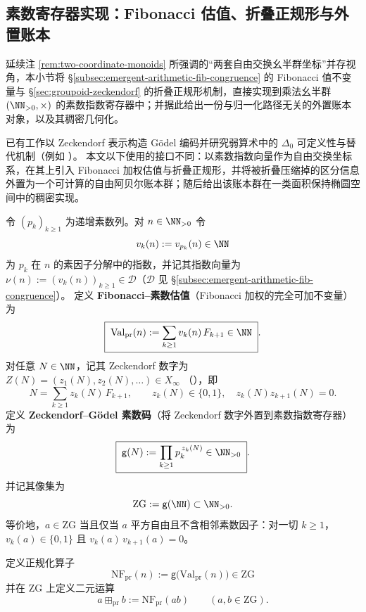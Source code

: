\subsection{素数寄存器实现：Fibonacci 估值、折叠正规形与外置账本}\label{subsec:emergent-arithmetic-prime-register-fib-valuation}

延续注 \ref{rem:two-coordinate-monoids} 所强调的“两套自由交换幺半群坐标”并存视角，本小节将 \S\ref{subsec:emergent-arithmetic-fib-congruence} 的 Fibonacci 值不变量与 \S\ref{sec:groupoid-zeckendorf} 的折叠正规形机制，直接实现到乘法幺半群 \((\NN_{>0},\times)\) 的素数指数寄存器中；并据此给出一份与归一化路径无关的外置账本对象，以及其稠密几何化。

\begin{remark}\label{rem:zeckendorf-godel-disambiguation}
已有工作以 Zeckendorf 表示构造 Gödel 编码并研究弱算术中的 \(\Delta_0\) 可定义性与替代机制（例如 \cite{Rosko2025FibonacciBasedGodelNumbering}）。
本文以下使用的接口不同：以素数指数向量作为自由交换坐标系，在其上引入 Fibonacci 加权估值与折叠正规形，并将被折叠压缩掉的区分信息外置为一个可计算的自由阿贝尔账本群；随后给出该账本群在一类面积保持椭圆空间中的稠密实现。
\end{remark}

\begin{definition}\label{def:prime-register-fib-valuation-zg-code}
令 \((p_k)_{k\ge 1}\) 为递增素数列。对 \(n\in\NN_{>0}\) 令
\[
v_k(n):=v_{p_k}(n)\in\NN
\]
为 \(p_k\) 在 \(n\) 的素因子分解中的指数，并记其指数向量为 \(\nu(n):=(v_k(n))_{k\ge 1}\in\mathcal D\)（\(\mathcal D\) 见 \S\ref{subsec:emergent-arithmetic-fib-congruence}）。
定义 \textbf{Fibonacci--素数估值}（Fibonacci 加权的完全可加不变量）为
\[
\boxed{\;
\mathrm{Val}_{\mathrm{pr}}(n):=\sum_{k\ge 1} v_k(n)\,F_{k+1}\in\NN\; }.
\]
对任意 \(N\in\NN\)，记其 Zeckendorf 数字为
\(
Z(N)=(z_1(N),z_2(N),\dots)\in X_\infty
\)
（\cite{Zeckendorf1972}），即
\[
N=\sum_{k\ge 1} z_k(N)\,F_{k+1},\qquad z_k(N)\in\{0,1\},\quad z_k(N)z_{k+1}(N)=0.
\]
定义 \textbf{Zeckendorf--Gödel 素数码}（将 Zeckendorf 数字外置到素数指数寄存器）为
\[
\boxed{\;
\mathsf{g}(N):=\prod_{k\ge 1} p_k^{\,z_k(N)}\in\NN_{>0}\; }.
\]
并记其像集为
\[
\mathrm{ZG}:=\mathsf{g}(\NN)\subset\NN_{>0}.
\]
等价地，\(a\in\mathrm{ZG}\) 当且仅当 \(a\) 平方自由且不含相邻素数因子：对一切 \(k\ge 1\)，
\(
v_k(a)\in\{0,1\}
\)
且
\(
v_k(a)\,v_{k+1}(a)=0
\)。
\end{definition}

\begin{definition}[素数寄存器上的折叠正规化]\label{def:prime-register-normal-form}
定义正规化算子
\[
\boxed{\;
\mathrm{NF}_{\mathrm{pr}}(n):=\mathsf{g}\bigl(\mathrm{Val}_{\mathrm{pr}}(n)\bigr)\in \mathrm{ZG}\;}
\]
并在 \(\mathrm{ZG}\) 上定义二元运算
\[
a\boxplus_{\mathrm{pr}} b:=\mathrm{NF}_{\mathrm{pr}}(ab)\qquad(a,b\in\mathrm{ZG}).
\]
\end{definition}

